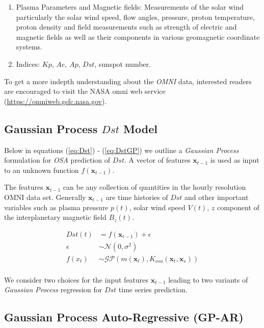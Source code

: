 \documentclass{article}
\begin{document}
\begin{enumerate}

\item Plasma Parameters and Magnetic fields: Measurements of the solar
  wind particularly the solar wind speed, flow angles, pressure,
  proton temperature, proton density and field measurements such as
  strength of electric and magnetic fields as well as their components
  in various geomagnetic coordinate systems.
  
\item Indices: $Kp$, $Ae$, $Ap$, $Dst$, sunspot number.
  
\end{enumerate}

To get a more indepth understanding about the \emph{OMNI} data,
interested readers are encouraged to visit the NASA omni web service (\url{https://omniweb.gsfc.nasa.gov}).

\subsection{Gaussian Process $Dst$ Model}

Below in equations (\ref{eq:Dst}) - (\ref{eq:DstGP}) we outline a
\emph{Gaussian Process} formulation for \emph{OSA} prediction of
$Dst$. A vector of features $\mathbf{x}_{t-1}$ is used as input to an
unknown function $f(\mathbf{x}_{t-1})$.

The features $\mathbf{x}_{t-1}$ can be any collection of quantities in
the hourly resolution OMNI data set. Generally $\mathbf{x}_{t-1}$ are
time histories of $Dst$ and other important variables such as plasma
pressure $p(t)$, solar wind speed $V(t)$, $z$ component of the
interplanetary magnetic field $B_z(t)$.


\begin{align}
  Dst(t) & =  f(\mathbf{x}_{t-1}) + \epsilon \label{eq:Dst} \\
  \epsilon & \sim  \mathcal{N}(0, \sigma^2) \label{eq:GPNoise} \\
  f(x_t) & \sim  \mathcal{GP}(m(\mathbf{x}_t), K_{osa}(\mathbf{x}_t, \mathbf{x}_s)) \label{eq:DstGP} \\
\end{align}

We consider two choices for the input features $\mathbf{x}_{t-1}$
leading to two variants of \emph{Gaussian Process} regression for
$Dst$ time series prediction.

\subsection{Gaussian Process Auto-Regressive (GP-AR)} \label{sec:gpar}
\end{document}
